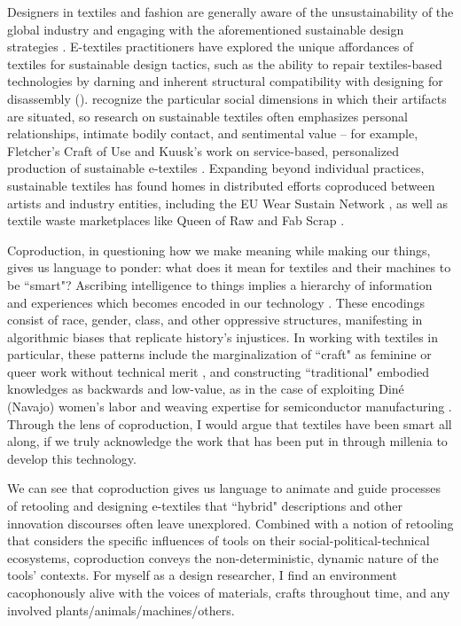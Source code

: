 Designers in textiles and fashion are generally aware of the unsustainability of the global industry and engaging with the aforementioned sustainable design strategies \cite{brydges_closing_2021,kohler_challenges_2013,veske_review_2020}. E-textiles practitioners have explored the unique affordances of textiles for sustainable design tactics, such as the ability to repair textiles-based technologies by darning \cite{jones_e-darning_2021} and inherent structural compatibility with designing for disassembly ().  recognize the particular social dimensions in which their artifacts are situated, so research on sustainable textiles often emphasizes personal relationships, intimate bodily contact, and sentimental value -- for example, Fletcher's Craft of Use \cite{fletcher_craft_2016} and Kuusk's work on service-based, personalized production of sustainable e-textiles \cite{kuusk_smart_2014}. Expanding beyond individual practices, sustainable textiles has found homes in distributed efforts coproduced between artists and industry entities, including the EU Wear Sustain Network \cite{goodman_wear_2018}, as well as textile waste marketplaces like Queen of Raw \cite{queen_of_raw_queen_2023} and Fab Scrap \cite{fabscrap_fabscrap_2023}.

Coproduction, in questioning how we make meaning while making our things, gives us language to ponder: what does it mean for textiles and their machines to be ``smart"? Ascribing intelligence to things implies a hierarchy of information and experiences which becomes encoded in our technology \cite{haraway_situated_1988,jansen_how_2019}. These encodings consist of race, gender, class, and other oppressive structures, manifesting in algorithmic biases that replicate history's injustices. In working with textiles in particular, these patterns include the marginalization of ``craft" as feminine or queer work without technical merit \cite{barber_womens_1996,bryan-wilson_fray_2021,goggin_women_2009,pepe_hot_2017}, and constructing ``traditional" embodied knowledges as backwards and low-value, as in the case of exploiting Din\'{e} (Navajo) women's labor and weaving expertise for semiconductor manufacturing \cite{nakamura_indigenous_2014}. Through the lens of coproduction, I would argue that textiles have been smart all along, if we truly acknowledge the work that has been put in through millenia to develop this technology.

We can see that coproduction gives us language to animate and guide processes of retooling and designing e-textiles that ``hybrid" descriptions and other innovation discourses often leave unexplored. Combined with a notion of retooling that considers the specific influences of tools on their social-political-technical ecosystems, coproduction conveys the non-deterministic, dynamic nature of the tools' contexts. For myself as a design researcher, I find an environment cacophonously alive with the voices of materials, crafts throughout time, and any involved plants/animals/machines/others. 


